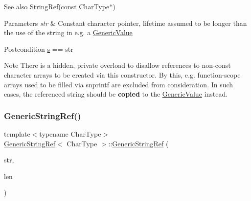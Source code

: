 \begin{DoxySeeAlso}{See also}
\hyperlink{struct_generic_string_ref_aa6b9fd9f6aa49405a574c362ba9af6b5}{String\+Ref(const Char\+Type$\ast$)}
\end{DoxySeeAlso}

\begin{DoxyParams}{Parameters}
{\em str} & Constant character pointer, lifetime assumed to be longer than the use of the string in e.\+g. a \hyperlink{class_generic_value}{Generic\+Value}\\
\hline
\end{DoxyParams}
\begin{DoxyPostcond}{Postcondition}
\hyperlink{struct_generic_string_ref_ac555994afd329bc9bc1780acf2f9d9be}{s} == str
\end{DoxyPostcond}
\begin{DoxyNote}{Note}
There is a hidden, private overload to disallow references to non-\/const character arrays to be created via this constructor. By this, e.\+g. function-\/scope arrays used to be filled via {\ttfamily snprintf} are excluded from consideration. In such cases, the referenced string should be {\bfseries copied} to the \hyperlink{class_generic_value}{Generic\+Value} instead. 
\end{DoxyNote}
\mbox{\label{struct_generic_string_ref_a8b2c6a7fdc4da1e7055f7fdcf0ac517f}} 
\subsubsection{\texorpdfstring{Generic\+String\+Ref()}{GenericStringRef()}\hspace{0.1cm}{\footnotesize\ttfamily [3/3]}}
{\footnotesize\ttfamily template$<$typename Char\+Type$>$ \\
\hyperlink{struct_generic_string_ref}{Generic\+String\+Ref}$<$ Char\+Type $>$\+::\hyperlink{struct_generic_string_ref}{Generic\+String\+Ref} (\begin{DoxyParamCaption}\item[{const Char\+Type $\ast$}]{str,  }\item[{\hyperlink{rapidjson_8h_a5ed6e6e67250fadbd041127e6386dcb5}{Size\+Type}}]{len }\end{DoxyParamCaption})\hspace{0.3cm}{\ttfamily [inline]}}



